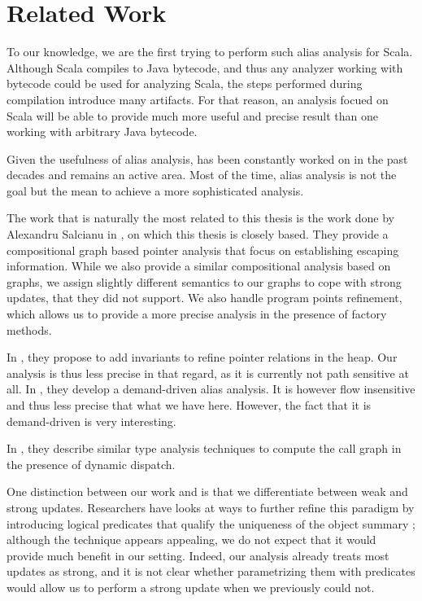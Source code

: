 \chapter{Related Work}
\label{chap:related}
To our knowledge, we are the first trying to perform such alias analysis for
Scala. Although Scala compiles to Java bytecode, and thus any analyzer working
with bytecode could be used for analyzing Scala, the steps performed during
compilation introduce many artifacts. For that reason, an analysis focued on
Scala will be able to provide much more useful and precise result than one
working with arbitrary Java bytecode.

Given the usefulness of alias analysis, has been constantly worked on in the
past decades and remains an active area. Most of the time, alias analysis is not
the goal but the mean to achieve a more sophisticated analysis.

The work that is naturally the most related to this thesis is the work done by
Alexandru Salcianu in \cite{Salcianu2001,Salcianu2006}, on which this thesis is
closely based. They provide a compositional graph based pointer analysis that
focus on establishing escaping information. While we also provide a similar
compositional analysis based on graphs, we assign slightly different semantics
to our graphs to cope with strong updates, that they did not support.  We also
handle program points refinement, which allows us to provide a more precise
analysis in the presence of factory methods.

In \cite{DBLP:conf/oopsla/DilligDA10}, they propose to add invariants to
refine pointer relations in the heap. Our analysis is thus less precise in
that regard, as it is currently not path sensitive at all. In
\cite{DBLP:conf/ecoop/ChalinJ07}, they develop a demand-driven alias analysis.
It is however flow insensitive and thus less precise that what we have here.
However, the fact that it is demand-driven is very interesting.

In
\cite{DBLP:conf/oopsla/DiwanMM96,DBLP:conf/oopsla/BaconS96,DBLP:conf/fossacs/JensenS01},
they describe similar type analysis techniques to compute the call graph in the
presence of dynamic dispatch.

One distinction between our work and \cite{Salcianu2006} is that we
differentiate between weak and strong updates. Researchers have looks at ways
to further refine this paradigm by introducing logical predicates that qualify
the uniqueness of the object summary \cite{DBLP:conf/esop/DilligDA10}; although
the technique appears appealing, we do not expect that it would provide much
benefit in our setting. Indeed, our analysis already treats most updates as
strong, and it is not clear whether parametrizing them with predicates would
allow us to perform a strong update when we previously could not.

